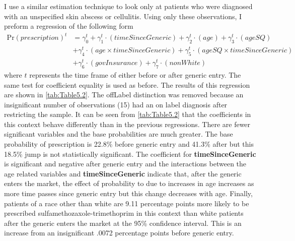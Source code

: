 \newpage
I use a similar estimation technique to look only at patients who were diagnosed with an unspecified skin abscess or cellulitis. Using only these observations, I preform a regression of the following form
\begin{equation}
\begin{split}
    \text{Pr}(prescription)^t & = \gamma^t_0 + \gamma^t_1\cdot(timeSinceGeneric)+ \gamma_2^t\cdot(age) + \gamma_3^t\cdot(ageSQ)\\
    &  + \gamma_4^t\cdot(age\times timeSinceGeneric)+ \gamma_5^t\cdot(ageSQ\times timeSinceGeneric)\\
    & + \gamma_6^t\cdot(govInsurance) + \gamma_7^t\cdot(nonWhite)
\end{split}
\end{equation}
where $t$ represents the time frame of either before or after generic entry. The same test for coefficient equality is used as before. The results of this regression are shown in \autoref{tab:Table5.2}. The offLabel distinction was removed because an insignificant number of observations (15) had an on label diagnosis after restricting the sample.
\indent It can be seen from \autoref{tab:Table5.2} that the coefficients in this context behave differently than in the previous regressions. There are fewer significant variables and the base probabilities are much greater. The base probability of prescription is 22.8\% before generic entry and 41.3\% after but this 18.5\% jump is not statistically significant. The coefficient for \textbf{timeSinceGeneric} is significant and negative after generic entry and the interactions between the age related variables and \textbf{timeSinceGeneric} indicate that, after the generic enters the market, the effect of probability to due to increases in age increases as more time passes since generic entry but this change decreases with age. Finally, patients of a race other than white are 9.11 percentage points more likely to be prescribed sulfamethozaxole-trimethoprim in this context than white patients after the generic enters the market at the 95\% confidence interval. This is an increase from an insignificant .0072 percentage points before generic entry.

